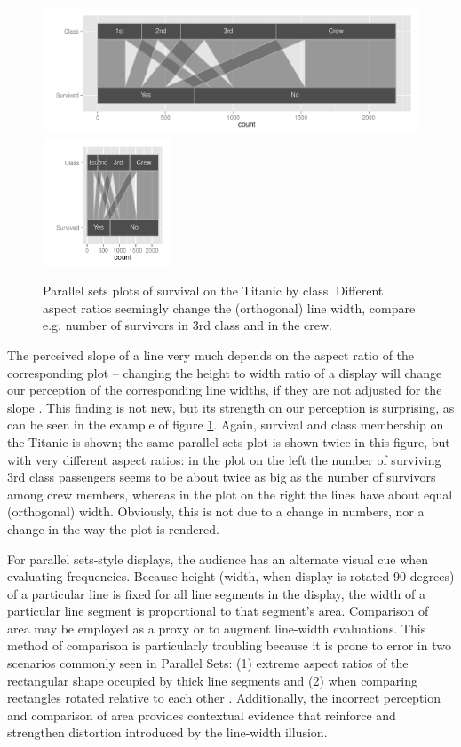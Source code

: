 

\begin{figure}[htbp]
\begin{center}
\includegraphics[height=1.5in]{images/aspect31-titanic.pdf}
\includegraphics[height=1.5in]{images/aspect33-titanic.pdf}
\end{center}
\caption{\label{fig:aspect}Parallel sets plots of survival on the Titanic by class. Different aspect ratios  seemingly change the (orthogonal) line width, compare e.g. number of survivors in 3rd class and in the crew. }
\end{figure}



The perceived slope of a line very much depends on the aspect ratio of the corresponding plot -- changing the height to width ratio of a display  will change our perception of the corresponding line widths, if they are not adjusted for the slope \cite{cleveland:1984}. This finding is not new, but its strength on our perception is surprising, as can be seen in the example of  figure \ref{fig:aspect}.  Again, survival and class membership on the Titanic is shown; the same parallel sets plot is shown twice in this figure, but with very different aspect ratios: in the  plot on the left the number of surviving 3rd class passengers seems to be about twice as big as the number of survivors among crew members, whereas in the plot on the right the lines have about equal (orthogonal) width. Obviously, this is not due to a change in numbers, nor a change in the way the plot is rendered. 

For parallel sets-style displays, the audience has an alternate visual cue when evaluating frequencies. Because height (width, when display is rotated 90 degrees) of a particular line is fixed for all line segments in the display, the width of a particular line segment is proportional to that segment's area. Comparison of area may be employed as a proxy or to augment line-width evaluations. This method of comparison is particularly troubling because it is prone to error in two scenarios commonly seen in Parallel Sets: (1) extreme aspect ratios of the rectangular shape occupied by thick line segments and (2) when comparing rectangles rotated relative to each other \citep{heer:2010, kong:2010}. Additionally, the incorrect perception and comparison of area provides contextual evidence that reinforce and strengthen distortion introduced by the line-width illusion.


